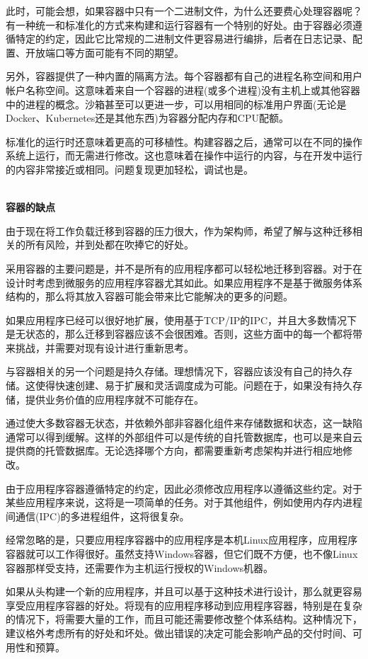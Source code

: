 此时，可能会想，如果容器中只有一个二进制文件，为什么还要费心处理容器呢？有一种统一和标准化的方式来构建和运行容器有一个特别的好处。由于容器必须遵循特定的约定，因此它比常规的二进制文件更容易进行编排，后者在日志记录、配置、开放端口等方面可能有不同的期望。

另外，容器提供了一种内置的隔离方法。每个容器都有自己的进程名称空间和用户帐户名称空间。这意味着来自一个容器的进程(或多个进程)没有主机上或其他容器中的进程的概念。沙箱甚至可以更进一步，可以用相同的标准用户界面(无论是Docker、Kubernetes还是其他东西)为容器分配内存和CPU配额。

标准化的运行时还意味着更高的可移植性。构建容器之后，通常可以在不同的操作系统上运行，而无需进行修改。这也意味着在操作中运行的内容，与在开发中运行的内容非常接近或相同。问题复现更加轻松，调试也是。

\hspace*{\fill} \\ %
\noindent
\textbf{容器的缺点}

由于现在将工作负载迁移到容器的压力很大，作为架构师，希望了解与这种迁移相关的所有风险，并到处都在吹捧它的好处。

采用容器的主要问题是，并不是所有的应用程序都可以轻松地迁移到容器。对于在设计时考虑到微服务的应用程序容器尤其如此。如果应用程序不是基于微服务体系结构的，那么将其放入容器可能会带来比它能解决的更多的问题。 

如果应用程序已经可以很好地扩展，使用基于TCP/IP的IPC，并且大多数情况下是无状态的，那么迁移到容器应该不会很困难。否则，这些方面中的每一个都将带来挑战，并需要对现有设计进行重新思考。

与容器相关的另一个问题是持久存储。理想情况下，容器应该没有自己的持久存储。这使得快速创建、易于扩展和灵活调度成为可能。问题在于，如果没有持久存储，提供业务价值的应用程序就不可能存在。

通过使大多数容器无状态，并依赖外部非容器化组件来存储数据和状态，这一缺陷通常可以得到缓解。这样的外部组件可以是传统的自托管数据库，也可以是来自云提供商的托管数据库。无论选择哪个方向，都需要重新考虑架构并进行相应地修改。

由于应用程序容器遵循特定的约定，因此必须修改应用程序以遵循这些约定。对于某些应用程序来说，这将是一项简单的任务。对于其他组件，例如使用内存内进程间通信(IPC)的多进程组件，这将很复杂。

经常忽略的是，只要应用程序容器中的应用程序是本机Linux应用程序，应用程序容器就可以工作得很好。虽然支持Windows容器，但它们既不方便，也不像Linux容器那样受支持，还需要作为主机运行授权的Windows机器。

如果从头构建一个新的应用程序，并且可以基于这种技术进行设计，那么就更容易享受应用程序容器的好处。将现有的应用程序移动到应用程序容器，特别是在复杂的情况下，将需要大量的工作，而且可能还需要修改整个体系结构。这种情况下，建议格外考虑所有的好处和坏处。做出错误的决定可能会影响产品的交付时间、可用性和预算。














